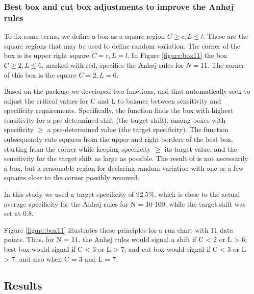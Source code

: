 \hypertarget{best-box-and-cut-box-adjustments-to-improve-the-anhj-rules}{%
\subsubsection{Best box and cut box adjustments to improve the Anhøj
rules}\label{best-box-and-cut-box-adjustments-to-improve-the-anhj-rules}}

To fix some terms, we define a box as a square region
\(C \geq c, L \leq l\). These are the square regions that may be used to
define random variation. The corner of the box is its upper right square
\(C = c, L = l\). In Figure \ref{figure:box11} the box
\(C \geq 2, L \leq 6\), marked with red, specifies the Anhøj rules for
\(N=11\). The corner of this box is the square \(C = 2, L = 6\).

Based on the  package we developed two functions,
 and  that automatically seek to adjust
the critical values for C and L to balance between sensitivity and
specificity requirements. Specifically, the  function
finds the box with highest sensitivity for a pre-determined shift (the
target shift), among boxes with specificity \(\geq\) a pre-determined
value (the target specificity). The  function
subsequently cuts squares from the upper and right borders of the best
box, starting from the corner while keeping specificity \(\geq\) its
target value, and the sensitivity for the target shift as large as
possible. The result of  is not necessarily a box, but a
reasonable region for declaring random variation with one or a few
squares close to the corner possibly removed.

In this study we used a target specificity of 92.5\%, which is close to
the actual average specificity for the Anhøj rules for N = 10-100, while
the target shift was set at 0.8.

Figure \ref{figure:box11} illustrates these principles for a run chart
with 11 data points. Thus, for N = 11, the Anhøj rules would signal a
shift if C \textless{} 2 or L \textgreater{} 6; best box would signal if
C \textless{} 3 or L \textgreater{} 7; and cut box would signal if C
\textless{} 3 or L \textgreater{} 7, and also when C = 3 and L = 7.

\hypertarget{results}{%
\subsection{Results}\label{results}}

